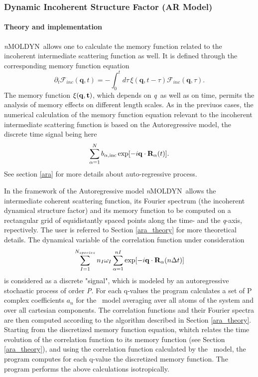 \documentclass[a4paper,11pt]{report}
\newcommand{\qval}{\textit{q}}
\newcommand{\NMOLDYN}{\textit{n}MOLDYN}
\begin{document}
\subsubsection{Dynamic Incoherent Structure Factor (AR Model)}
\label{disfar}
\paragraph{Theory and implementation\\}
\label{disfar_theory}
\NMOLDYN\ allows one to calculate the memory function related to the incoherent intermediate scattering function as well. 
It is defined through the corresponding memory function equation
\begin{equation}
\label{eq:mem_finc}
\partial_t{\mathcal F_{inc}}(\mathbf{q},t) =
-\int_{0}^{t}d\tau\,\xi(\mathbf{q},t-\tau){\mathcal F_{inc}}(\mathbf{q},\tau).
\end{equation}
The memory function $\xi(\bf{q},t)$, which depends on \qval\ as well as on time, permits the analysis of memory effects on 
different length scales. As in the previuos cases, the numerical calculation of the memory function equation relevant to 
the incoherent intermediate scattering function is based on the Autoregressive model, the discrete time signal being here
\begin{equation}
\label{eq:disfar_rho}
\sum_{\alpha=1}^N b_{\alpha,\mathrm{inc}}\exp[-i{\bf q}\cdot{\bf R}_\alpha(t)].
\end{equation}
See section \ref{ara} for more details about auto-regressive process.

In the framework of the Autoregressive model \NMOLDYN\ allows the intermediate coherent scattering function, its Fourier spectrum 
(the incoherent dynamical structure factor) and its memory function to be computed on a rectangular grid of equidistantly 
spaced points along the time- and the \qval-axis, repectively. The user is referred to Section \ref{ara_theory} for more theoretical 
details. The dynamical variable of the correlation function under consideration
\begin{equation}
\sum_{I=1}^{N_{species}} n_I \omega_I \sum^{nI}_{\alpha=1} \exp[-i{\bf q}\cdot{\bf R}_\alpha(n\Delta t)]
\end{equation}
is considered as a discrete "signal", which 
is modeled by an autoregressive stochastic process of order \textit{P}. For each q-values the program calculates a set of P complex 
coefficients ${a_n}$ for the \AR\ model averaging aver all atoms of the system and over all cartesian components. The 
correlation functions and their Fourier spectra are then computed according to the algorithm described in 
Section \ref{ara_theory}. Starting from the discretized memory function equation, whitch relates the time 
evolution of the correlation function to its memory function (see Section \ref{ara_theory}), and using the correlation function calculated by the \AR\ model, the program computes for each q-value the discretized memory function.
The program performs the above calculations isotropically.
\end{document}
